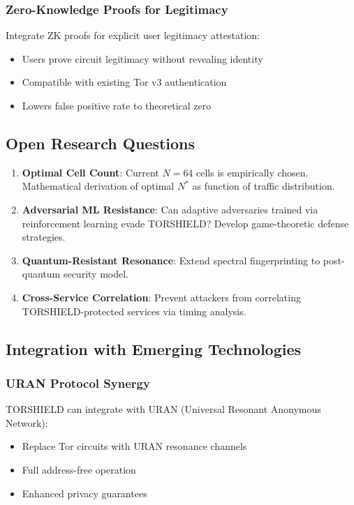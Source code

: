 \documentclass[11pt,a4paper]{article}
\begin{document}
\subsubsection{Zero-Knowledge Proofs for Legitimacy}

Integrate ZK proofs for explicit user legitimacy attestation:
\begin{itemize}
\item Users prove circuit legitimacy without revealing identity
\item Compatible with existing Tor v3 authentication
\item Lowers false positive rate to theoretical zero
\end{itemize}

\subsection{Open Research Questions}

\begin{enumerate}
\item \textbf{Optimal Cell Count}: Current $N = 64$ cells is empirically chosen. Mathematical derivation of optimal $N^*$ as function of traffic distribution.

\item \textbf{Adversarial ML Resistance}: Can adaptive adversaries trained via reinforcement learning evade TORSHIELD? Develop game-theoretic defense strategies.

\item \textbf{Quantum-Resistant Resonance}: Extend spectral fingerprinting to post-quantum security model.

\item \textbf{Cross-Service Correlation}: Prevent attackers from correlating TORSHIELD-protected services via timing analysis.
\end{enumerate}

\subsection{Integration with Emerging Technologies}

\subsubsection{URAN Protocol Synergy}

TORSHIELD can integrate with URAN (Universal Resonant Anonymous Network):
\begin{itemize}
\item Replace Tor circuits with URAN resonance channels
\item Full address-free operation
\item Enhanced privacy guarantees
\end{itemize}
\end{document}
